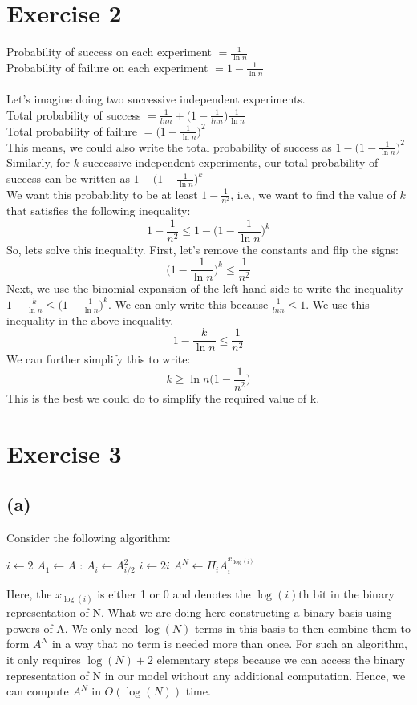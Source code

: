 \documentclass[a4paper,12pt]{article} %
\begin{document}
\section*{Exercise 2}
Probability of success on each experiment $= \frac{1}{\ln n}$\\
Probability of failure on each experiment $= 1 - \frac{1}{\ln n}$\\
\\
Let's imagine doing two successive independent experiments.\\
Total probability of success $= \frac{1}{ln n} + \bigg(1 - \frac{1}{ln n}\bigg)\frac{1}{\ln n}$\\
Total probability of failure $= \bigg(1 - \frac{1}{\ln n}\bigg)^2$\\
This means, we could also write the total probability of success as $1 - \bigg(1 - \frac{1}{\ln n}\bigg)^2$\\
Similarly, for $k$ successive independent experiments, our total probability of success can be written as $1 - \bigg(1 - \frac{1}{\ln n}\bigg)^k$\\
We want this probability to be at least $1 - \frac{1}{n^2}$, i.e., we want to find the value of $k$ that satisfies the following inequality:
\[1 - \frac{1}{n^2} \leq 1 - \bigg(1 - \frac{1}{\ln n}\bigg)^k\]
So, lets solve this inequality. First, let's remove the constants and flip the signs:
\[\bigg(1 - \frac{1}{\ln n}\bigg)^k \leq \frac{1}{n^2}\]
Next, we use the binomial expansion of the left hand side to write the inequality $1 - \frac{k}{\ln n} \leq \bigg(1 - \frac{1}{\ln n}\bigg)^k$. We can only write this because $\frac{1}{ln n} \leq 1$. We use this inequality in the above inequality.
\[1 - \frac{k}{\ln n} \leq \frac{1}{n^2}\]
We can further simplify this to write:
\[k \geq \ln n\bigg(1 - \frac{1}{n^2}\bigg)\]
This is the best we could do to simplify the required value of k.

\section*{Exercise 3}
\subsection*{(a)}
    Consider the following algorithm:
        \begin{algorithmic}
            \State $i \gets 2$
            \State $A_1 \gets A$
            :
                \State $A_i \gets A_{i/2}^2$
                \State $i \gets 2i$
            \EndWhile
            \State $A^N \gets \Pi_{i}A_i^{x_{\log(i)}}$
        \end{algorithmic}
    Here, the $x_{\log(i)}$ is either 1 or 0 and denotes the ${\log(i)}$th bit in the binary representation of N. What we are doing here constructing a binary basis using powers of A. We only need $\log(N)$ terms in this basis to then combine them to form $A^N$ in a way that no term is needed more than once. For such an algorithm, it only requires $\log(N) + 2$ elementary steps because we can access the binary representation of N in our model without any additional computation. Hence, we can compute $A^N$ in $O(\log(N))$ time.
\end{document}
